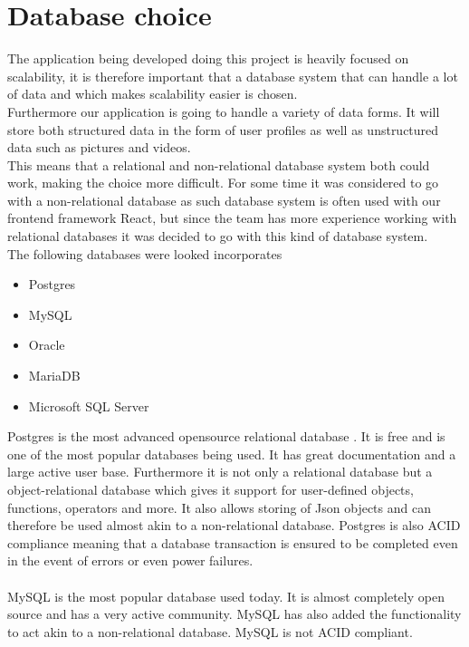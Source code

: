 \section{Database choice}
The application being developed doing this project is heavily focused on scalability, it is therefore important that a database system that can handle a lot of data and which makes scalability easier is chosen.
\\
Furthermore our application is going to handle a variety of data forms. It will store both structured data in the form of user profiles as well as unstructured data such as pictures and videos.
\\
This means that a relational and non-relational database system both could work, making the choice more difficult.
For some time it was considered to go with a non-relational database as such database system is often used with our frontend framework React, but since the team has more experience working with relational databases it was decided to go with this kind of database system.
\\
The following databases were looked incorporates
\begin{itemize}
    \item Postgres
    \item MySQL
    \item Oracle
    \item MariaDB
    \item Microsoft SQL Server
\end{itemize}
Postgres is the most advanced opensource relational database \cite{Postgres}.
It is free and is one of the most popular databases being used\cite{databasePopularity}.
It has great documentation and a large active user base.
Furthermore it is not only a relational database but a object-relational database which gives it support for user-defined objects, functions, operators and more.
It also allows storing of Json objects and can therefore be used almost akin to a non-relational database.
Postgres is also ACID compliance meaning that a database transaction is ensured to be completed even in the event of errors or even power failures.
\\
\\
MySQL is the most popular database used today\cite{databasePopularity}.
It is almost completely open source and has a very active community\cite{MySQL}.
MySQL has also added the functionality to act akin to a non-relational database.
MySQL is not ACID compliant.
\\
\\
